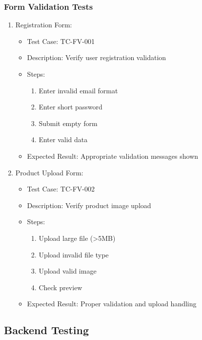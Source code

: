 \subsubsection{Form Validation Tests}
\begin{enumerate}
    \item Registration Form:
    \begin{itemize}
        \item Test Case: TC-FV-001
        \item Description: Verify user registration validation
        \item Steps:
        \begin{enumerate}
            \item Enter invalid email format
            \item Enter short password
            \item Submit empty form
            \item Enter valid data
        \end{enumerate}
        \item Expected Result: Appropriate validation messages shown
    \end{itemize}

    \item Product Upload Form:
    \begin{itemize}
        \item Test Case: TC-FV-002
        \item Description: Verify product image upload
        \item Steps:
        \begin{enumerate}
            \item Upload large file (>5MB)
            \item Upload invalid file type
            \item Upload valid image
            \item Check preview
        \end{enumerate}
        \item Expected Result: Proper validation and upload handling
    \end{itemize}
\end{enumerate}

\subsection{Backend Testing}
